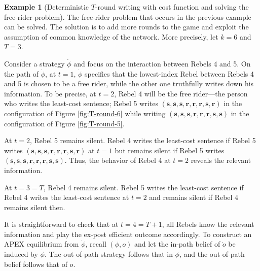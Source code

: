 \documentclass[12pt,letter]{article}
\newcommand\omicron{o}
\theoremstyle{definition}
\newtheorem{example}{Example}
\theoremstyle{remark}
\theoremstyle{claim}
\begin{document}
\begin{example}[Deterministic $T$-round writing with cost function and solving the free-rider problem]
\label{ex:cost_function_talk_solve_fr}
The free-rider problem that occurs in the previous example can be solved. The solution is to add more rounds to the game and exploit the assumption of common knowledge of the network. More precisely, let $k=6$ and $T=3$. 

Consider a strategy $\dot{\phi}$ and focus on the interaction between Rebels 4 and 5. On the path of $\dot{\phi}$, at $t=1$, $\dot{\phi}$ specifies that the lowest-index Rebel between Rebels 4 and 5 is chosen to be a free rider, while the other one truthfully writes down his information. To be precise, at $t=2$, Rebel 4 will be the free rider---the person who writes the least-cost sentence; Rebel 5 writes $(\textbf{s},\textbf{s},\textbf{s},\textbf{r},\textbf{r},\textbf{r},\textbf{s},\textbf{r})$ in the configuration of Figure \ref{fig:T-round-6} while writing $(\textbf{s},\textbf{s},\textbf{s},\textbf{r},\textbf{r},\textbf{r},\textbf{s},\textbf{s})$ in the configuration of Figure \ref{fig:T-round-5}. 

At $t=2$, Rebel 5 remains silent. Rebel 4 writes the least-cost sentence if Rebel 5 writes $(\textbf{s},\textbf{s},\textbf{s},\textbf{r},\textbf{r},\textbf{r},\textbf{s},\textbf{r})$ at $t=1$ but remains silent if Rebel 5 writes $(\textbf{s},\textbf{s},\textbf{s},\textbf{r},\textbf{r},\textbf{r},\textbf{s},\textbf{s})$. Thus, the behavior of Rebel 4 at $t=2$ reveals the relevant information. 

At $t=3=T$, Rebel 4 remains silent. Rebel 5 writes the least-cost sentence if Rebel 4 writes the least-cost sentence at $t=2$ and remains silent if Rebel 4 remains silent then. 

It is straightforward to check that at $t=4=T+1$, all Rebels know the relevant information and play the ex-post efficient outcome accordingly. To construct an APEX equilibrium from $\dot{\phi}$, recall $(\phi,\omicron)$ and let the in-path belief of $\dot{\omicron}$ be induced by $\dot{\phi}$. The out-of-path strategy follows that in $\phi$, and the out-of-path belief follows that of $\omicron$.   


\end{example}
\end{document}
